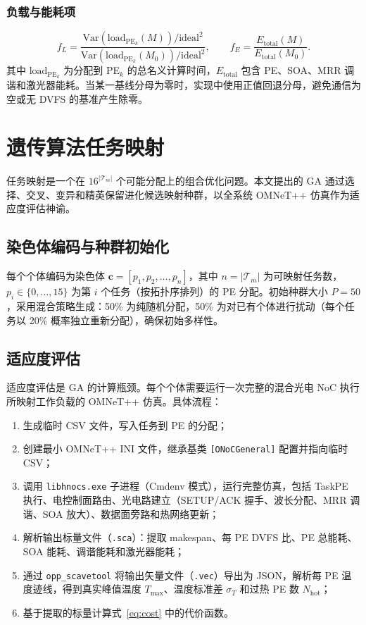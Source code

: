 \documentclass[conference]{IEEEtran}
\begin{document}
\subsubsection{负载与能耗项}
\begin{equation}
f_L = \frac{\text{Var}(\text{load}_{\text{PE}_k}(M))/\text{ideal}^2}
{\text{Var}(\text{load}_{\text{PE}_k}(M_0))/\text{ideal}^2}, \qquad
f_E = \frac{E_{\text{total}}(M)}{E_{\text{total}}(M_0)} .
\end{equation}
其中 $\text{load}_{\text{PE}_k}$ 为分配到 PE$_k$ 的总名义计算时间，$E_{\text{total}}$ 包含 PE、SOA、MRR 调谐和激光器能耗。当某一基线分母为零时，实现中使用正值回退分母，避免通信为空或无 DVFS 的基准产生除零。

\section{遗传算法任务映射}

任务映射是一个在 $16^{|\mathcal{T}_m|}$ 个可能分配上的组合优化问题。本文提出的 GA 通过选择、交叉、变异和精英保留进化候选映射种群，以全系统 OMNeT++ 仿真作为适应度评估神谕。

\subsection{染色体编码与种群初始化}

每个个体编码为染色体 $\mathbf{c} = [p_1, p_2, \ldots, p_n]$，其中 $n = |\mathcal{T}_m|$ 为可映射任务数，$p_i \in \{0,\ldots,15\}$ 为第 $i$ 个任务（按拓扑序排列）的 PE 分配。初始种群大小 $P = 50$，采用混合策略生成：50\% 为纯随机分配，50\% 为对已有个体进行扰动（每个任务以 20\% 概率独立重新分配），确保初始多样性。

\subsection{适应度评估}

适应度评估是 GA 的计算瓶颈。每个个体需要运行一次完整的混合光电 NoC 执行所映射工作负载的 OMNeT++ 仿真。具体流程：

\begin{enumerate}
\item 生成临时 CSV 文件，写入任务到 PE 的分配；
\item 创建最小 OMNeT++ INI 文件，继承基类 \texttt{[ONoCGeneral]} 配置并指向临时 CSV；
\item 调用 \texttt{libhnocs.exe} 子进程（Cmdenv 模式），运行完整仿真，包括 TaskPE 执行、电控制面路由、光电路建立（SETUP/ACK 握手、波长分配、MRR 调谐、SOA 放大）、数据面旁路和热网络更新；
\item 解析输出标量文件（\texttt{.sca}）：提取 makespan、每 PE DVFS 比、PE 总能耗、SOA 能耗、调谐能耗和激光器能耗；
\item 通过 \texttt{opp\_scavetool} 将输出矢量文件（\texttt{.vec}）导出为 JSON，解析每 PE 温度迹线，得到真实峰值温度 $T_{\max}$、温度标准差 $\sigma_T$ 和过热 PE 数 $N_{\text{hot}}$；
\item 基于提取的标量计算式~\eqref{eq:cost} 中的代价函数。
\end{enumerate}
\end{document}

